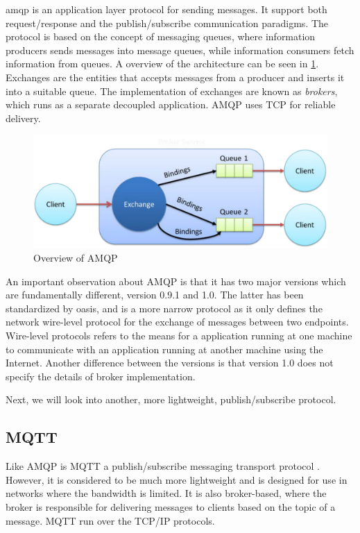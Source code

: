 \gls{amqp} is an application layer protocol for sending messages. It support
both request/response and the publish/subscribe communication paradigms. The
protocol is based on the concept of messaging queues, where information
producers sends messages into message queues, while information consumers fetch
information from queues. A overview of the architecture can be seen in
\cref{figure-amqp}. Exchanges are the entities that accepts messages from a
producer and inserts it into a suitable queue. The implementation of exchanges
are known as \textit{brokers}, which runs as a separate decoupled application.
AMQP uses TCP for reliable delivery.

\begin{figure}[h]
\includegraphics[scale=0.35]{images/amqp.pdf}
\caption{Overview of AMQP}
\label{figure-amqp}
\end{figure}

An important observation about AMQP is that it has two major versions which are
fundamentally different, version 0.9.1 and 1.0. The latter has been standardized
by \gls{oasis}\cite{oasis-amqp}, and is a  more narrow protocol as it only defines the network
wire-level protocol for the exchange of messages between two endpoints.
Wire-level protocols refers to the means for a application running at one
machine to communicate with an application running at another machine using the
Internet. Another difference between the versions is that version 1.0 does not
specify the details of broker implementation.

Next, we will look into another, more lightweight, publish/subscribe protocol.

\subsection{MQTT}

Like AMQP is MQTT a publish/subscribe messaging transport protocol
\cite{oasis-mqtt}. However, it is considered to be much more lightweight and is
designed for use in networks where the bandwidth is limited. It is also
broker-based, where the broker is responsible for delivering messages to clients
based on the topic of a message. MQTT run over the TCP/IP protocols.



